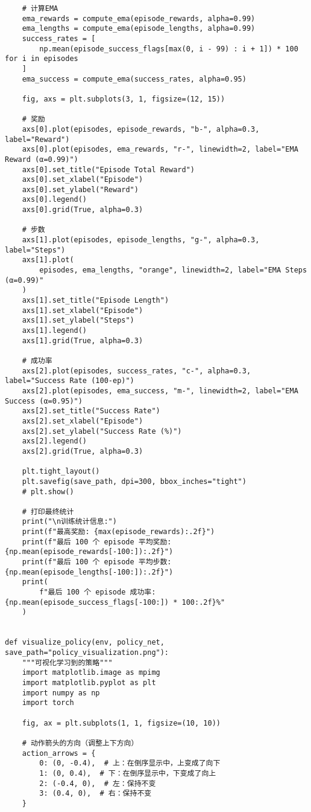 \begin{verbatim}
    # 计算EMA
    ema_rewards = compute_ema(episode_rewards, alpha=0.99)
    ema_lengths = compute_ema(episode_lengths, alpha=0.99)
    success_rates = [
        np.mean(episode_success_flags[max(0, i - 99) : i + 1]) * 100 for i in episodes
    ]
    ema_success = compute_ema(success_rates, alpha=0.95)

    fig, axs = plt.subplots(3, 1, figsize=(12, 15))

    # 奖励
    axs[0].plot(episodes, episode_rewards, "b-", alpha=0.3, label="Reward")
    axs[0].plot(episodes, ema_rewards, "r-", linewidth=2, label="EMA Reward (α=0.99)")
    axs[0].set_title("Episode Total Reward")
    axs[0].set_xlabel("Episode")
    axs[0].set_ylabel("Reward")
    axs[0].legend()
    axs[0].grid(True, alpha=0.3)

    # 步数
    axs[1].plot(episodes, episode_lengths, "g-", alpha=0.3, label="Steps")
    axs[1].plot(
        episodes, ema_lengths, "orange", linewidth=2, label="EMA Steps (α=0.99)"
    )
    axs[1].set_title("Episode Length")
    axs[1].set_xlabel("Episode")
    axs[1].set_ylabel("Steps")
    axs[1].legend()
    axs[1].grid(True, alpha=0.3)

    # 成功率
    axs[2].plot(episodes, success_rates, "c-", alpha=0.3, label="Success Rate (100-ep)")
    axs[2].plot(episodes, ema_success, "m-", linewidth=2, label="EMA Success (α=0.95)")
    axs[2].set_title("Success Rate")
    axs[2].set_xlabel("Episode")
    axs[2].set_ylabel("Success Rate (%)")
    axs[2].legend()
    axs[2].grid(True, alpha=0.3)

    plt.tight_layout()
    plt.savefig(save_path, dpi=300, bbox_inches="tight")
    # plt.show()

    # 打印最终统计
    print("\n训练统计信息:")
    print(f"最高奖励: {max(episode_rewards):.2f}")
    print(f"最后 100 个 episode 平均奖励: {np.mean(episode_rewards[-100:]):.2f}")
    print(f"最后 100 个 episode 平均步数: {np.mean(episode_lengths[-100:]):.2f}")
    print(
        f"最后 100 个 episode 成功率: {np.mean(episode_success_flags[-100:]) * 100:.2f}%"
    )


def visualize_policy(env, policy_net, save_path="policy_visualization.png"):
    """可视化学习到的策略"""
    import matplotlib.image as mpimg
    import matplotlib.pyplot as plt
    import numpy as np
    import torch

    fig, ax = plt.subplots(1, 1, figsize=(10, 10))

    # 动作箭头的方向（调整上下方向）
    action_arrows = {
        0: (0, -0.4),  # 上：在倒序显示中，上变成了向下
        1: (0, 0.4),  # 下：在倒序显示中，下变成了向上
        2: (-0.4, 0),  # 左：保持不变
        3: (0.4, 0),  # 右：保持不变
    }


\end{verbatim}
